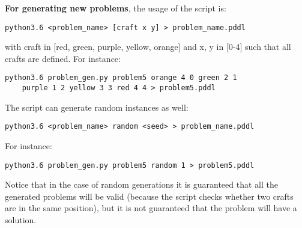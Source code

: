 \documentclass{article}
\begin{document}
\begin{enumerate}
\textbf{For generating new problems}, the usage of the script is:
\begin{verbatim}
python3.6 <problem_name> [craft x y] > problem_name.pddl
\end{verbatim}
with craft in [red, green, purple, yellow, orange] and x, y in [0-4] such that all crafts are defined. For instance:
\begin{verbatim}
python3.6 problem_gen.py problem5 orange 4 0 green 2 1
    purple 1 2 yellow 3 3 red 4 4 > problem5.pddl
\end{verbatim}

The script can generate random instances as well:
\begin{verbatim}
python3.6 <problem_name> random <seed> > problem_name.pddl
\end{verbatim}
For instance:
\begin{verbatim}
python3.6 problem_gen.py problem5 random 1 > problem5.pddl
\end{verbatim}
Notice that in the case of random generations it is guaranteed that all the generated problems will be valid (because the script checks whether two crafts are in the same position), but it is not guaranteed that the problem will have a solution.
\end{enumerate}
\end{document}
